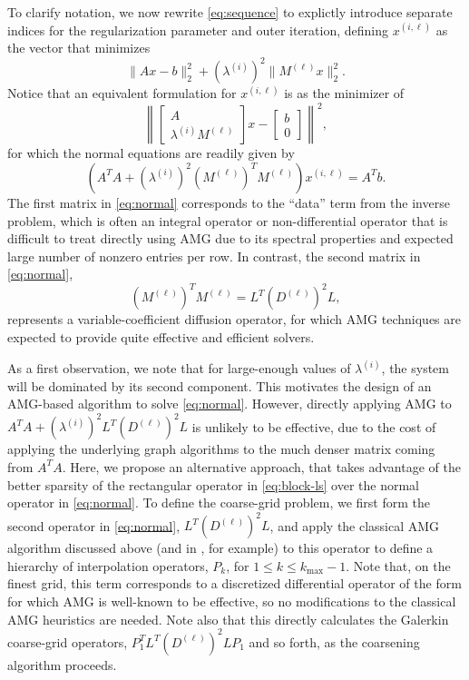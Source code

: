 To clarify notation, we now rewrite \eqref{eq:sequence} to explictly
introduce separate indices for the regularization parameter and outer
iteration, defining $x^{(i,\ell)}$ as the vector that minimizes
\[
\| A x - b \|_2^2 + \left(\lambda^{(i)}\right)^2 \| M^{(\ell)} x \|_2^2.
\]
Notice that an equivalent formulation for $x^{(i,\ell)}$ is as the
minimizer of
\begin{equation}
\label{eq:block-ls}
\left\| \left[\begin{array}{c} A \\ \lambda^{(i)}
                           M^{(\ell)}\end{array}\right]x - \left[\begin{array}{c} b \\ 0 \end{array}\right]\right\|^2,
\end{equation}
for which the normal equations are readily given by
\begin{equation}
\label{eq:normal}
\left(A^TA + \left(\lambda^{(i)}\right)^2 \left(M^{(\ell)}\right)^TM^{(\ell)}\right)x^{(i,\ell)} = A^Tb.
\end{equation}
The first matrix in \eqref{eq:normal} corresponds to the ``data'' term
from the inverse problem, which is often an integral operator or
non-differential operator that is difficult to treat directly using
AMG due to its spectral properties and expected large number of
nonzero entries per row.  In contrast, the second matrix
in \eqref{eq:normal},
\[
\left(M^{(\ell)}\right)^TM^{(\ell)} = L^T\left(D^{(\ell)}\right)^2L,
\]
represents a variable-coefficient diffusion operator, for which AMG
techniques are expected to provide quite effective and efficient
solvers.

As a first observation, we note that for large-enough values of
$\lambda^{(i)}$, the system will be dominated by its second component.
This motivates the design of an AMG-based algorithm to
solve \eqref{eq:normal}.  However, directly applying AMG to $A^TA
+ \left(\lambda^{(i)}\right)^2 L^T\left(D^{(\ell)}\right)^2L$ is
unlikely to be effective, due to the cost of applying the underlying
graph algorithms to the much denser matrix coming from $A^TA$.  Here,
we propose an alternative approach, that takes advantage of the better
sparsity of the rectangular operator in \eqref{eq:block-ls} over the
normal operator in \eqref{eq:normal}.  To define the coarse-grid
problem, we first form the second operator in \eqref{eq:normal},
$L^T\left(D^{(\ell)}\right)^2L$, and apply the classical AMG algorithm
discussed above (and in \cite{JWRuge_KStuben_1987a}, for example) to
this operator to define a hierarchy of interpolation operators, $P_k$,
for $1 \leq k \leq k_{\text{max}}-1$.  Note that, on the finest grid,
this term corresponds to a discretized differential operator of the
form for which AMG is well-known to be effective, so no modifications
to the classical AMG heuristics are needed.  Note also that this
directly calculates the Galerkin coarse-grid operators,
$P_1^TL^T\left(D^{(\ell)}\right)^2LP_1$ and so forth, as the
coarsening algorithm proceeds.

